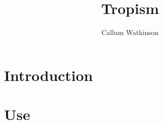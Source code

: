 \documentclass{report}
\title{Tropism}
\author{Callum Watkinson}
\begin{document}
\maketitle

\chapter{Introduction}

\chapter{Use}

\printindex
\end{document}
